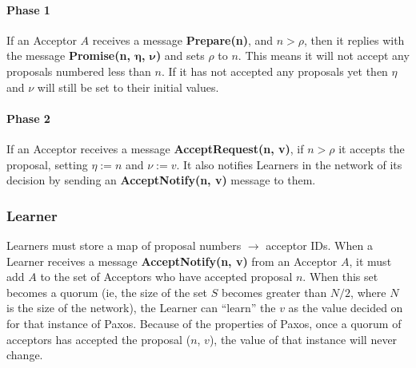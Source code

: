 \documentclass[12pt,twoside,notitlepage]{report}
\newcommand{\msg}[1] {{\bf #1}}         %
\begin{document}
\paragraph{Phase 1}

If an Acceptor $A$ receives a message \msg{Prepare(n)}, and $n > \rho$, then it replies with the
message \msg{Promise(n, $\bm{\eta}$, $\bm{\nu}$)} and sets $\rho$ to $n$. This means it will not
accept any proposals numbered less than $n$. If it has not accepted any proposals yet then $\eta$
and $\nu$ will still be set to their initial values.

\paragraph{Phase 2}

If an Acceptor receives a message \msg{AcceptRequest(n, v)}, if $n > \rho$ it accepts the
proposal, setting $\eta := n$ and $\nu := v$. It also notifies Learners in the network of its
decision by sending an \msg{AcceptNotify(n, v)} message to them.


\subsubsection*{Learner}

Learners must store a map of proposal numbers $\rightarrow$ acceptor IDs. When a Learner receives a
message \msg{AcceptNotify(n, v)} from an Acceptor $A$, it must add $A$ to the set of Acceptors who
have accepted proposal $n$. When this set becomes a quorum (ie, the size of the set $S$ becomes
greater than $N / 2$, where $N$ is the size of the network), the Learner can ``learn'' the $v$ as
the value decided on for that instance of Paxos. Because of the properties of Paxos, once a quorum
of acceptors has accepted the proposal ($n$, $v$), the value of that instance will never change.
\end{document}
